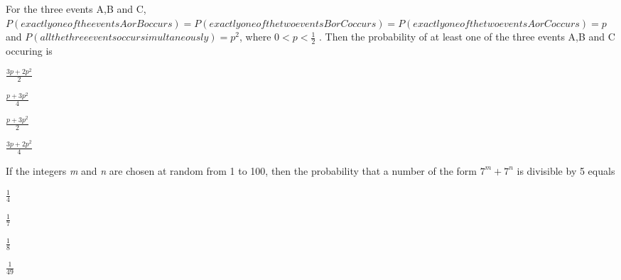 \item For the three events A,B and C, $P(exactly one of the events A or B occurs) = P(exactly one of the two events B or C occurs) = P(exactly one of the two events A or C occurs ) = p$ and $P(all the three events occur simultaneously) = p^2$, where $ 0 < p < \frac{1}{2}$ . Then the probability of at least one of the three events A,B and C occuring is \hfill{}
	\begin{enumerate}
	\end{enumerate}
\item If the integers \emph{m} and \emph{n} are chosen at random from 1 to 100, then the probability that a number of the form $ 7^m + 7^n $ is divisible by 5 equals \hfill{}
	\begin{enumerate}
			\begin{multicols}{4}
			\item $\frac{1}{4}$ \item $\frac{1}{7}$ \item $\frac{1}{8}$ \item $\frac{1}{49}$
			\end{multicols}
	\end{enumerate}
